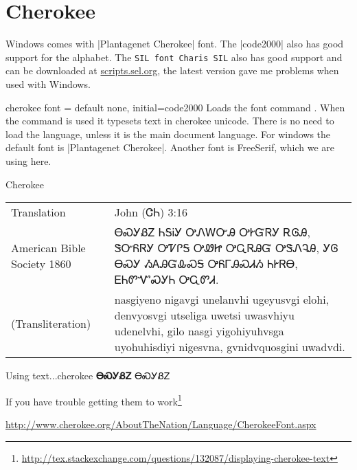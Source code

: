 \section{Cherokee}
\label{s:cherokee}
Windows comes with |Plantagenet Cherokee| font. The |code2000| also has good support for the alphabet. The \texttt{SIL font Charis SIL} also has good support and can be downloaded at \href{http://scripts.sil.org/cms/scripts/page.php?item_id=CharisSIL_download}{scripts.sel.org}, the latest version gave me problems when used with Windows. 

  
\def\textcherokee#1{{\cherokee   #1}}


\begin{docKey}[phd]{cherokee font}{ = } {default none, initial=code2000}
 Loads the font
command \cmd{\cherokee}. When the command is used it typesets text in
cherokee unicode. There is no need to load the language, unless it is the main document language. For windows the default font is  |Plantagenet Cherokee|. Another font is FreeSerif, which we are using here.
\end{docKey}

\begin{scriptexample}[]{Cherokee}
{\cherokee
\begin{tabular}{lp{8.5cm}}
Translation	  &John (ᏣᏂ) 3:16\\
American Bible Society 1860	&ᎾᏍᎩᏰᏃ ᏂᎦᎥᎩ ᎤᏁᎳᏅᎯ ᎤᎨᏳᏒᎩ ᎡᎶᎯ, ᏕᏅᏲᏒᎩ ᎤᏤᎵᎦ ᎤᏪᏥ ᎤᏩᏒᎯᏳ ᎤᏕᏁᎸᎯ, ᎩᎶ ᎾᏍᎩ ᏱᎪᎯᏳᎲᏍᎦ ᎤᏲᎱᎯᏍᏗᏱ ᏂᎨᏒᎾ, ᎬᏂᏛᏉᏍᎩᏂ ᎤᏩᏛᏗ.\\

(Transliteration)	& nasgiyeno nigavgi unelanvhi ugeyusvgi elohi, denvyosvgi utseliga uwetsi uwasvhiyu udenelvhi, gilo nasgi yigohiyuhvsga uyohuhisdiyi nigesvna, gvnidvquosgini uwadvdi.\\
\end{tabular}}
\end{scriptexample}

\begin{texexample}{Using text...}{cherokee}
\bgroup
\cherokee \large\textbf{ᎾᏍᎩᏰᏃ}
\textcherokee{ᎾᏍᎩᏰᏃ}
\egroup
\end{texexample}

If you have trouble getting them to work\footnote{\url{http://tex.stackexchange.com/questions/132087/displaying-cherokee-text}}

\url{http://www.cherokee.org/AboutTheNation/Language/CherokeeFont.aspx}



